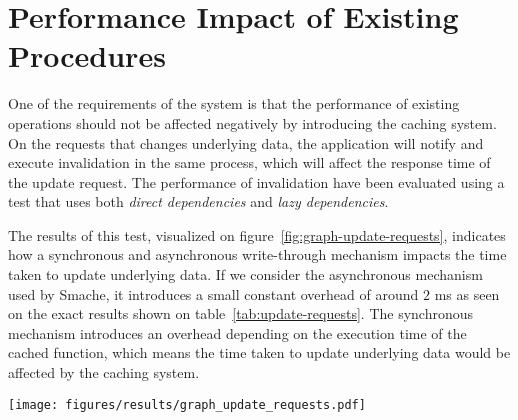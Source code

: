 \begin{figure*}[ht!]
  
  \caption{Code where Smache can cache the course score, but not the individual participant scores.}
  \label{code:running-example-non-cachable}
\end{figure*}


\section{Performance Impact of Existing Procedures}
\label{sec:performance-impact-of-existing-procedures}

One of the requirements of the system is that the performance of existing operations should not be affected negatively by introducing the caching system. On the requests that changes underlying data, the application will notify and execute invalidation in the same process, which will affect the response time of the update request. The performance of invalidation have been evaluated using a test that uses both \emph{direct dependencies} and \emph{lazy dependencies}.

The results of this test, visualized on figure~\ref{fig:graph-update-requests}, indicates how a synchronous and asynchronous write-through mechanism impacts the time taken to update underlying data. If we consider the asynchronous mechanism used by Smache, it introduces a small constant overhead of around $2$ ms as seen on the exact results shown on table~\ref{tab:update-requests}. The synchronous mechanism introduces an overhead depending on the execution time of the cached function, which means the time taken to update underlying data would be affected by the caching system.

\begin{figure*}[ht!]
  \centering
  \texttt{[image: figures/results/graph\_update\_requests.pdf]}
  \caption{Impact of introducing synchronous and asynchronous write-through in a case, where the update affects a single cached object instance with variable execution time.}
  \label{fig:graph-update-requests}
\end{figure*}

